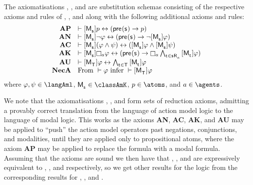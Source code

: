 \begin{definition}
The axiomatisations \axiomAmlK{}, \axiomAmlKFF{}, and \axiomAmlS{} are substitution schemas consisting of the respective axioms and rules of \axiomK{}, \axiomKFF{}, and \axiomS{} along with the following additional axioms and rules:
$$
\begin{array}{rl}
    {\bf AP} & \proves \actionA{\aPModel{\aStateS}} \atomP \iff (\aPrecondition(\aStateS) \implies \atomP)\\
    {\bf AN} & \proves \actionA{\aPModel{\aStateS}} \lnot \phi \iff (\aPrecondition(\aStateS) \implies \lnot \actionA{\aPModel{\aStateS}} \phi)\\
    {\bf AC} & \proves \actionA{\aPModel{\aStateS}} (\phi \land \psi) \iff (\actionA{\aPModel{\aStateS}} \phi \land \actionA{\aPModel{\aStateS}} \psi)\\
    {\bf AK} & \proves \actionA{\aPModel{\aStateS}} \necessaryA \phi \iff (\aPrecondition(\aStateS) \implies \necessaryA \bigwedge_{\aStateT \in \aSuccessorsA{\aStateS}} \actionA{\aPModel{\aStateT}} \phi)\\
    {\bf AU} & \proves \actionA{\aPModel{\aStatesT}} \phi \iff \bigwedge_{\aStateT \in \aStatesT} \actionA{\aPModel{\aStateT}} \phi\\
    {\bf NecA} & \text{From } \proves \phi \text{ infer } \proves \actionA{\aPModel{\aStatesT}} \phi
\end{array}
$$
where $\phi, \psi \in \langAml$, $\aPModel{\aStateS} \in \classAmK$, $\atomP \in \atoms$, and $\agentA \in \agents$.
\end{definition}

We note that the axiomatisations \axiomAmlK{}, \axiomAmlKFF{}, and \axiomAmlS{} form sets of reduction axioms, admitting a provably correct translation from the language \langAml{} of action model logic to the language \langMl{} of modal logic.
This works as the axioms {\bf AN}, {\bf AC}, {\bf AK}, and {\bf AU} may be applied to ``push'' the action model operators past negations, conjunctions, and modalities, until they are applied only to propositional atoms, where the axiom {\bf AP} may be applied to replace the formula with a modal formula.
Assuming that the axioms are sound we then have that \logicAmlK{}, \logicAmlKFF{}, and \logicAmlS{} are expressively equivalent to \logicK{}, \logicKFF{}, and \logicS{} respectively, so we get other results for the logic from the corresponding results for \logicK{}, \logicKFF{}, and \logicS{}.

